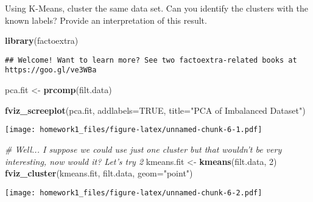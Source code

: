 \documentclass[
]{article}
\newenvironment{Shaded}{\begin{snugshade}}{\end{snugshade}}
\newcommand{\CommentTok}[1]{\textcolor[rgb]{0.56,0.35,0.01}{\textit{#1}}}
\newcommand{\DataTypeTok}[1]{\textcolor[rgb]{0.13,0.29,0.53}{#1}}
\newcommand{\DecValTok}[1]{\textcolor[rgb]{0.00,0.00,0.81}{#1}}
\newcommand{\KeywordTok}[1]{\textcolor[rgb]{0.13,0.29,0.53}{\textbf{#1}}}
\newcommand{\NormalTok}[1]{#1}
\newcommand{\OtherTok}[1]{\textcolor[rgb]{0.56,0.35,0.01}{#1}}
\newcommand{\StringTok}[1]{\textcolor[rgb]{0.31,0.60,0.02}{#1}}
\begin{document}
Using K-Means, cluster the same data set. Can you identify the clusters
with the known labels? Provide an interpretation of this result.

\begin{Shaded}
\begin{Highlighting}[]
\KeywordTok{library}\NormalTok{(factoextra)}
\end{Highlighting}
\end{Shaded}

\begin{verbatim}
## Welcome! Want to learn more? See two factoextra-related books at https://goo.gl/ve3WBa
\end{verbatim}

\begin{Shaded}
\begin{Highlighting}[]
\NormalTok{pca.fit <-}\StringTok{ }\KeywordTok{prcomp}\NormalTok{(filt.data)}

\KeywordTok{fviz_screeplot}\NormalTok{(pca.fit, }
               \DataTypeTok{addlabels=}\OtherTok{TRUE}\NormalTok{, }
               \DataTypeTok{title=}\StringTok{"PCA of Imbalanced Dataset"}\NormalTok{)}
\end{Highlighting}
\end{Shaded}

\texttt{[image: homework1\_files/figure-latex/unnamed-chunk-6-1.pdf]}

\begin{Shaded}
\begin{Highlighting}[]
\CommentTok{# Well... I suppose we could use just one cluster but that wouldn't be very interesting, now would it? Let's try 2}
\NormalTok{kmeans.fit <-}\StringTok{ }\KeywordTok{kmeans}\NormalTok{(filt.data, }\DecValTok{2}\NormalTok{)}
\KeywordTok{fviz_cluster}\NormalTok{(kmeans.fit, filt.data, }\DataTypeTok{geom=}\StringTok{"point"}\NormalTok{)}
\end{Highlighting}
\end{Shaded}

\texttt{[image: homework1\_files/figure-latex/unnamed-chunk-6-2.pdf]}
\end{document}
